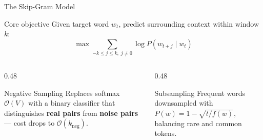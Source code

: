 \documentclass[11pt,aspectratio=169,professionalfonts]{beamer}
\begin{document}
%
\begin{frame}{The Skip-Gram Model}

  \begin{block}{Core objective}
    Given target word $w_t$, predict surrounding context within window $k$:
    \[
      \max \sum_{-k \le j \le k,\; j \ne 0} \log P(w_{t+j} \mid w_t)
    \]
  \end{block}

  \vspace{0.4em}
  \begin{columns}[T]
    \begin{column}{0.48\textwidth}
      \begin{block}{Negative Sampling}
        Replaces softmax $\mathcal{O}(V)$ with a binary classifier
        that distinguishes \textbf{real pairs} from
        \textbf{noise pairs} — cost drops to
        $\mathcal{O}(k_{\text{neg}})$.
      \end{block}
    \end{column}
    \begin{column}{0.48\textwidth}
      \begin{block}{Subsampling}
        Frequent words downsampled with
        $P(w) = 1 - \sqrt{t / f(w)}$,
        balancing rare and common tokens.
      \end{block}
    \end{column}
  \end{columns}
\end{frame}
%
%
\end{document}
